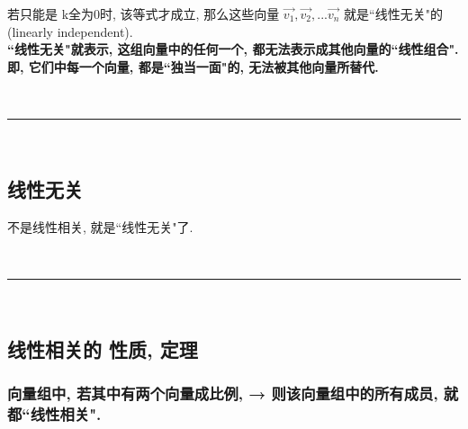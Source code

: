 \documentclass[UTF8]{ctexart}
\begin{document}
若只能是 k全为0时, 该等式才成立, 那么这些向量 $ \vec{v_1},  \vec{v_2}, ...  \vec{v_n}$ 就是``线性无关"的 (linearly independent). \\

\textbf{``线性无关"就表示, 这组向量中的任何一个, 都无法表示成其他向量的``线性组合". 即, 它们中每一个向量, 都是``独当一面"的, 无法被其他向量所替代.}

~\\
\hrule
~\\

\subsection{线性无关}

不是线性相关, 就是``线性无关"了.

~\\
\hrule
~\\

\subsection{线性相关的 性质, 定理}

\subsubsection{向量组中, 若其中有两个向量成比例, → 则该向量组中的所有成员, 就都``线性相关".}
\end{document}
